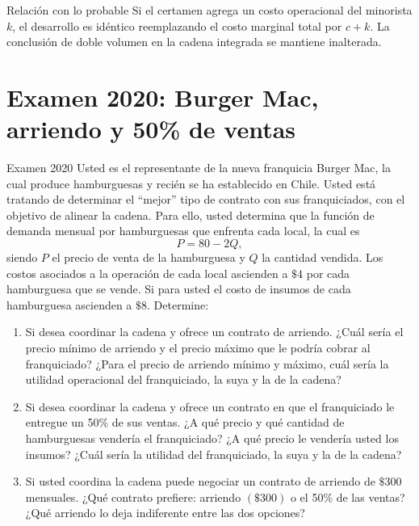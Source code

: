 \documentclass[11pt,a4paper]{article}
\begin{document}
\begin{analisis}{Relación con lo probable}
Si el certamen agrega un costo operacional del minorista \(k\), el desarrollo es idéntico reemplazando el costo marginal total por \(c + k\). La conclusión de doble volumen en la cadena integrada se mantiene inalterada.
\end{analisis}

\section{Examen 2020: Burger Mac, arriendo y 50\% de ventas}

\begin{enunciado}{Examen 2020}
Usted es el representante de la nueva franquicia Burger Mac, la cual produce hamburguesas y recién se ha establecido en Chile. Usted está tratando de determinar el ``mejor'' tipo de contrato con sus franquiciados, con el objetivo de alinear la cadena. Para ello, usted determina que la función de demanda mensual por hamburguesas que enfrenta cada local, la cual es
\[
P=80-2Q,
\]
siendo \(P\) el precio de venta de la hamburguesa y \(Q\) la cantidad vendida. Los costos asociados a la operación de cada local ascienden a \(\$4\) por cada hamburguesa que se vende. Si para usted el costo de insumos de cada hamburguesa ascienden a \(\$8\). Determine:

\begin{enumerate}[label=\alph*)]
    \item Si desea coordinar la cadena y ofrece un contrato de arriendo. ¿Cuál sería el precio mínimo de arriendo y el precio máximo que le podría cobrar al franquiciado? ¿Para el precio de arriendo mínimo y máximo, cuál sería la utilidad operacional del franquiciado, la suya y la de la cadena?
    \item Si desea coordinar la cadena y ofrece un contrato en que el franquiciado le entregue un 50\% de sus ventas. ¿A qué precio y qué cantidad de hamburguesas vendería el franquiciado? ¿A qué precio le vendería usted los insumos? ¿Cuál sería la utilidad del franquiciado, la suya y la de la cadena?
    \item Si usted coordina la cadena puede negociar un contrato de arriendo de \(\$300\) mensuales. ¿Qué contrato prefiere: arriendo \((\$300)\) o el 50\% de las ventas? ¿Qué arriendo lo deja indiferente entre las dos opciones?
\end{enumerate}
\end{enunciado}
\end{document}
